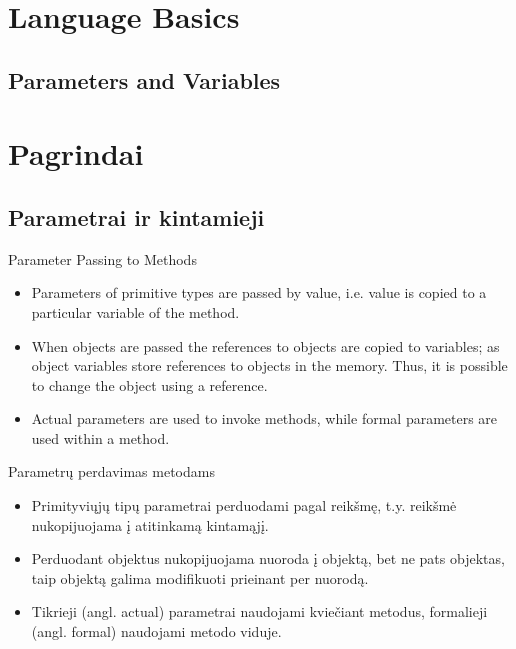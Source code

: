 \LangSpec{\GenLang}
{\section{Language Basics}
\subsection{Parameters and Variables}
}
{
\section{Pagrindai}
\subsection{Parametrai ir kintamieji}
}

\LangSpec{\GenLang}
{\begin{frame}{Parameter Passing to Methods}
\begin{itemize}
\item Parameters of primitive types are passed by value, i.e. value is copied to a particular variable of the method.
\item When objects are passed the references to objects are copied to variables; as object variables store references to objects in the memory. Thus, it is possible to change the object using a reference.
\item Actual parameters are used to invoke methods, while formal parameters are used within a method. 
\end{itemize}
\end{frame}
}
{
\begin{frame}{Parametrų perdavimas metodams}
\begin{itemize}
\item Primityviųjų tipų parametrai perduodami pagal reikšmę, t.y. reikšmė nukopijuojama į atitinkamą kintamąjį.
\item Perduodant objektus nukopijuojama nuoroda į objektą, bet ne pats objektas, taip objektą galima modifikuoti prieinant per nuorodą.
\item Tikrieji (angl. actual) parametrai naudojami kviečiant metodus, formalieji (angl. formal) naudojami metodo viduje.
\end{itemize}
\end{frame}
}

